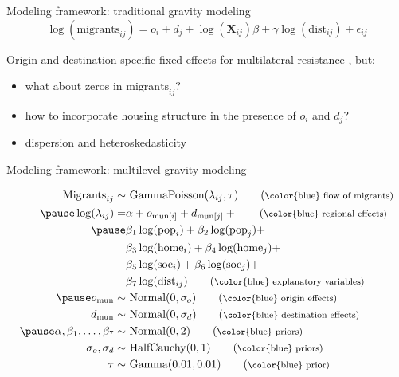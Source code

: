 \documentclass{beamer}
\begin{document}
\begin{frame}{Modeling framework: traditional gravity modeling}
	\begin{equation*}
	\log(\text{migrants}_{ij}) = o_i + d_j +  \log(\mathbf{X}_{ij})\beta + \gamma\log(\text{dist}_{ij}) + \epsilon_{ij}
	\label{eq:gravfixed}
	\end{equation*} 
	
	Origin and destination specific \alert{fixed} effects for multilateral resistance \citep{anderson2003gravity}, but:
	\begin{itemize}
		\item what about \alert{zeros} in $\text{migrants}_{ij}$?
		\item how to incorporate \alert{housing} structure in the presence of $o_i$ and $d_j$?
		\item \alert{dispersion} and \alert{heteroskedasticity} \citep{silva2006log}
	\end{itemize}
\end{frame}

\begin{frame}[fragile]{Modeling framework: multilevel gravity modeling}
\begin{small}
	\begin{align} \text{Migrants}_{ij} \sim & \text{ GammaPoisson}(\lambda_{ij}, \tau) \tag{\footnotesize \color{blue} flow of migrants} \\ \pause
	\log(\lambda_{ij}) =
	& \alpha + o_{\text{mun}[i]} + d_{\text{mun}[j]} + \tag{\footnotesize \color{blue} regional effects}  \\ \pause
	& \beta_1 \log(\text{pop}_i) + \notag
	\beta_2\log(\text{pop}_j) + \notag \\ & \beta_3
	\log(\text{home}_i) + \beta_4 \log(\text{home}_j) + \notag\\
	& \beta_5 \log(\text{soc}_i) + \beta_6 \log(\text{soc}_j) + \notag \\ 
	& \beta_7 \log(\text{dist}_{ij})  \tag{\footnotesize \color{blue} explanatory variables}  \\ \pause
	o_{\text{mun}} \sim& \text{ Normal}(0, \sigma_o)  \tag{\footnotesize \color{blue} origin effects}  \\ 
	d_{\text{mun}} \sim& \text{ Normal}(0, \sigma_d)   \tag{\footnotesize \color{blue} destination effects}  \\ \pause
	\alpha, \beta_1,\ldots, \beta_7 \sim& \text{
		Normal}(0,2) \tag{\footnotesize \color{blue} priors} \\ 
	\sigma_o, \sigma_d \sim& \text{ HalfCauchy}(0,1) \tag{\footnotesize \color{blue} priors}  \\ 
	\tau \sim& \text{ Gamma}(0.01, 0.01)  \tag{\footnotesize \color{blue} prior}  
	\end{align}
\end{small}
\end{frame}
\end{document}
